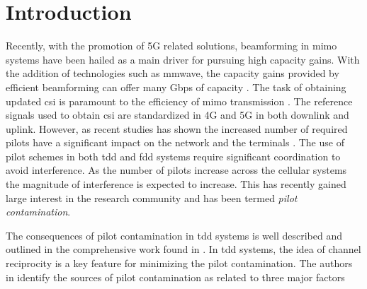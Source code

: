 \section{Introduction}\label{sec:pilot_introduction}

Recently, with the promotion of 5G related solutions, beamforming in \gls{mimo} systems have been hailed as a main driver for pursuing high capacity gains. With the addition of technologies such as \gls{mmwave}, the capacity gains provided by efficient beamforming can offer many Gbps of capacity \cite{Ahmed2018APerspectives}. The task of obtaining updated \gls{csi} is paramount to the efficiency of \gls{mimo} transmission \cite{Lee2012TheInterference, Medard2000TheChannel}. The reference signals used to obtain \gls{csi} are standardized in 4G and 5G in both downlink and uplink. However, as recent studies has shown the increased number of required pilots have a significant impact on the network and the terminals \cite{Elijah2016ASystem}. The use of pilot schemes in both \gls{tdd} and \gls{fdd} systems require significant coordination to avoid interference. As the number of pilots increase across the cellular systems the magnitude of interference is expected to increase. This has recently gained large interest in the research community and has been termed \emph{pilot contamination}. 





The consequences of pilot contamination in \gls{tdd} systems is well described and outlined in the comprehensive work found in \cite{Elijah2016ASystem}. In \gls{tdd} systems, the idea of channel reciprocity is a key feature for minimizing the pilot contamination. The authors in \cite{Elijah2016ASystem} identify the sources of pilot contamination as related to three major factors

